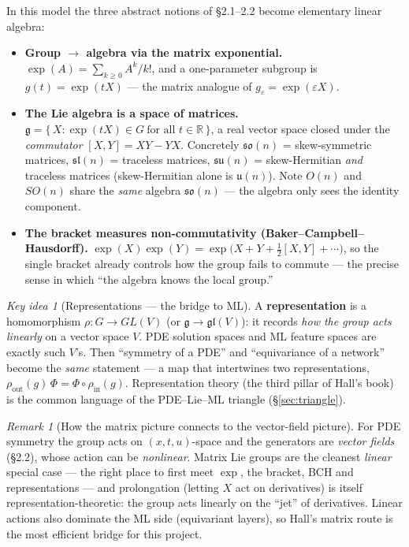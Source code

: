 \documentclass[11pt]{article}
\theoremstyle{definition}
\theoremstyle{remark}
\newtheorem{remark}{Remark}[section]
\newtheorem*{keyidea}{Key idea}
\newcommand{\g}{\mathfrak{g}}
\newcommand{\R}{\mathbb{R}}
\begin{document}
In this model the three abstract notions of \S2.1--2.2 become elementary linear algebra:
\begin{itemize}[nosep]
  \item \textbf{Group $\to$ algebra via the matrix exponential.} $\exp(A)=\sum_{k\ge0}A^k/k!$, and a
        one-parameter subgroup is $g(t)=\exp(tX)$ --- the matrix analogue of $g_\varepsilon=\exp(\varepsilon X)$.
  \item \textbf{The Lie algebra is a space of matrices.} $\g=\{\,X:\exp(tX)\in G\ \text{for all }t\in\R\,\}$,
        a real vector space closed under the \emph{commutator} $[X,Y]=XY-YX$. Concretely
        $\mathfrak{so}(n)$ = skew-symmetric matrices, $\mathfrak{sl}(n)$ = traceless matrices,
        $\mathfrak{su}(n)$ = skew-Hermitian \emph{and} traceless matrices (skew-Hermitian alone is $\mathfrak{u}(n)$).
        Note $O(n)$ and $SO(n)$ share the \emph{same} algebra $\mathfrak{so}(n)$ --- the algebra only sees the identity component.
  \item \textbf{The bracket measures non-commutativity (Baker--Campbell--Hausdorff).}
        $\exp(X)\exp(Y)=\exp\!\big(X+Y+\tfrac12[X,Y]+\cdots\big)$, so the single bracket already controls
        how the group fails to commute --- the precise sense in which ``the algebra knows the local group.''
\end{itemize}

\begin{keyidea}[Representations --- the bridge to ML]
A \textbf{representation} is a homomorphism $\rho:G\to GL(V)$ (or $\g\to\mathfrak{gl}(V)$): it records
\emph{how the group acts linearly} on a vector space $V$. PDE solution spaces and ML feature spaces are
exactly such $V$'s. Then ``symmetry of a PDE'' and ``equivariance of a network'' become the \emph{same}
statement --- a map that intertwines two representations,
$\rho_{\text{out}}(g)\,\Phi=\Phi\circ\rho_{\text{in}}(g)$. Representation theory (the third pillar of
Hall's book) is the common language of the PDE--Lie--ML triangle (\S\ref{sec:triangle}).
\end{keyidea}

\begin{remark}[How the matrix picture connects to the vector-field picture]
For PDE symmetry the group acts on $(x,t,u)$-space and the generators are \emph{vector fields} (\S2.2),
whose action can be \emph{nonlinear}. Matrix Lie groups are the cleanest \emph{linear} special case --- the
right place to first meet $\exp$, the bracket, BCH and representations --- and prolongation (letting $X$ act
on derivatives) is itself representation-theoretic: the group acts linearly on the ``jet'' of derivatives.
Linear actions also dominate the ML side (equivariant layers), so Hall's matrix route is the most efficient
bridge for this project.
\end{remark}
\end{document}
